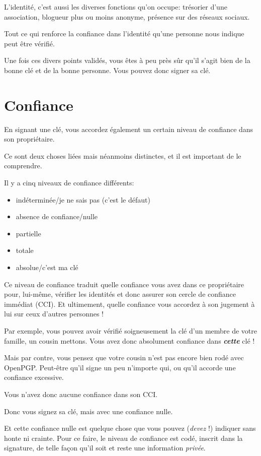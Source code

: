 L'identité, c'est aussi les diverses fonctions qu'on occupe: trésorier
d'une association, blogueur plus ou moins anonyme, présence sur des
réseaux sociaux.

Tout ce qui renforce la confiance dans l'identité qu'une personne nous
indique peut être vérifié.

Une fois ces divers points validés, vous êtes à peu près sûr qu'il
s'agit bien de la bonne clé et de la bonne personne. Vous pouvez donc
signer sa clé.

\section{Confiance}\label{confiance}

En signant une clé, vous accordez également un certain niveau de
confiance dans son propriétaire.

Ce sont deux choses liées mais néanmoins distinctes, et il est important
de le comprendre.

Il y a cinq niveaux de confiance différents:

\begin{itemize}
\itemsep1pt\parskip0pt
\item
  indéterminée/je ne sais pas (c'est le défaut)
\item
  absence de confiance/nulle
\item
  partielle
\item
  totale
\item
  absolue/c'est ma clé
\end{itemize}

Ce niveau de confiance traduit quelle confiance vous avez dans ce
propriétaire pour, lui-même, vérifier les identités et donc assurer son
cercle de confiance immédiat (CCI). Et ultimement, quelle confiance vous
accordez à son jugement à lui sur ceux d'autres personnes !

Par exemple, vous pouvez avoir vérifié soigneusement la clé d'un membre
de votre famille, un cousin mettons. Vous avez donc absolument confiance
dans \textbf{\emph{cette}} clé !

Mais par contre, vous pensez que votre cousin n'est pas encore bien rodé
avec OpenPGP. Peut-être qu'il signe un peu n'importe qui, ou qu'il
accorde une confiance excessive.

Vous n'avez donc aucune confiance dans son CCI.

Donc vous signez sa clé, mais avec une confiance nulle.

Et cette confiance nulle est quelque chose que vous pouvez (\emph{devez}
!) indiquer sans honte ni crainte. Pour ce faire, le niveau de confiance
est codé, inscrit dans la signature, de telle façon qu'il soit et reste
une information \emph{privée}.

